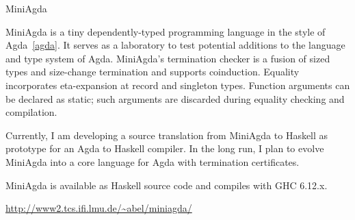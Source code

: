 \begin{hcarentry}{MiniAgda}
\makeheader

MiniAgda is a tiny dependently-typed programming language in the style
of Agda~\cref{agda}. It serves as a laboratory to test potential additions to the
language and type system of Agda. MiniAgda's termination checker is a
fusion of sized types and size-change termination and supports
coinduction. Equality incorporates eta-expansion at record and
singleton types. Function arguments can be declared as static; such
arguments are discarded during equality checking and compilation.

Currently, I am developing a source translation from MiniAgda to
Haskell as prototype for an Agda to Haskell compiler. In the long
run, I plan to evolve MiniAgda into a core language for Agda with
termination certificates.

MiniAgda is available as Haskell source code and compiles with GHC
6.12.x.

\FurtherReading
  \url{http://www2.tcs.ifi.lmu.de/\~abel/miniagda/}
\end{hcarentry}
